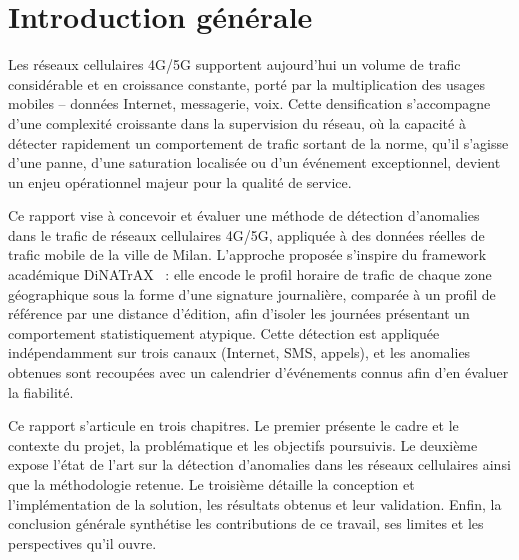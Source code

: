 \chapter*{Introduction générale}
\label{ch:intro}

Les réseaux cellulaires 4G/5G supportent aujourd'hui un volume de
trafic considérable et en croissance constante, porté par la
multiplication des usages mobiles -- données Internet, messagerie,
voix. Cette densification s'accompagne d'une complexité croissante
dans la supervision du réseau, où la capacité à détecter rapidement un
comportement de trafic sortant de la norme, qu'il s'agisse d'une
panne, d'une saturation localisée ou d'un événement exceptionnel,
devient un enjeu opérationnel majeur pour la qualité de service.

Ce rapport vise à concevoir et évaluer une méthode de détection
d'anomalies dans le trafic de réseaux cellulaires 4G/5G, appliquée à
des données réelles de trafic mobile de la ville de Milan. L'approche
proposée s'inspire du framework académique
DiNATrAX~\parencite{maudoux2024dinatrax} : elle encode le profil horaire de trafic
de chaque zone géographique sous la forme d'une signature journalière,
comparée à un profil de référence par une distance d'édition, afin
d'isoler les journées présentant un comportement statistiquement
atypique. Cette détection est appliquée indépendamment sur trois
canaux (Internet, SMS, appels), et les anomalies obtenues sont
recoupées avec un calendrier d'événements connus afin d'en évaluer la
fiabilité.

Ce rapport s'articule en trois chapitres. Le premier présente le cadre
et le contexte du projet, la problématique et les objectifs poursuivis.
Le deuxième expose l'état de l'art sur la détection d'anomalies dans
les réseaux cellulaires ainsi que la méthodologie retenue. Le
troisième détaille la conception et l'implémentation de la solution,
les résultats obtenus et leur validation. Enfin, la conclusion
générale synthétise les contributions de ce travail, ses limites et
les perspectives qu'il ouvre.
